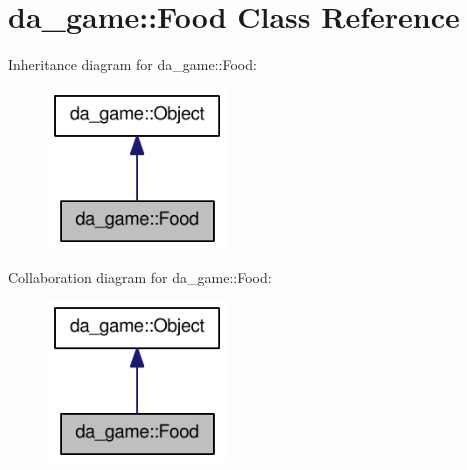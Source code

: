 \hypertarget{classda__game_1_1Food}{
\section{da\_\-game::Food Class Reference}
\label{classda__game_1_1Food}
}
Inheritance diagram for da\_\-game::Food:\nopagebreak
\begin{figure}[H]
\begin{center}
\leavevmode
\includegraphics[width=134pt]{classda__game_1_1Food__inherit__graph}
\end{center}
\end{figure}
Collaboration diagram for da\_\-game::Food:\nopagebreak
\begin{figure}[H]
\begin{center}
\leavevmode
\includegraphics[width=134pt]{classda__game_1_1Food__coll__graph}
\end{center}
\end{figure}
